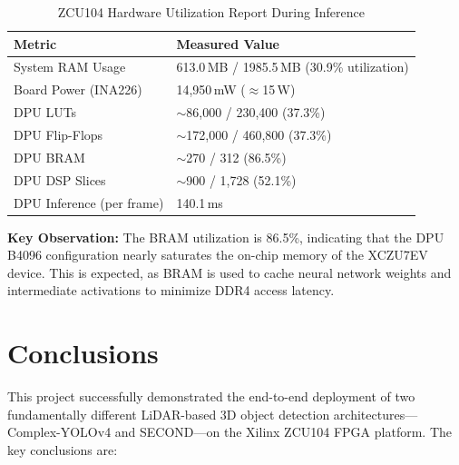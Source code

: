 \documentclass[12pt, a4paper]{report}
\begin{document}
\begin{table}[H]
\centering
\caption{ZCU104 Hardware Utilization Report During Inference}
\label{tab:hw_report}
\begin{tabular}{@{}p{4.5cm} p{9cm}@{}}
\toprule
\textbf{Metric} & \textbf{Measured Value} \\
\midrule
System RAM Usage & 613.0\,MB / 1985.5\,MB (30.9\% utilization) \\
Board Power (INA226) & 14,950\,mW ($\approx$15\,W) \\
DPU LUTs & $\sim$86,000 / 230,400 (37.3\%) \\
DPU Flip-Flops & $\sim$172,000 / 460,800 (37.3\%) \\
DPU BRAM & $\sim$270 / 312 (86.5\%) \\
DPU DSP Slices & $\sim$900 / 1,728 (52.1\%) \\
DPU Inference (per frame) & 140.1\,ms \\
\bottomrule
\end{tabular}
\end{table}

\textbf{Key Observation:} The BRAM utilization is 86.5\%, indicating that the DPU B4096 configuration nearly saturates the on-chip memory of the XCZU7EV device. This is expected, as BRAM is used to cache neural network weights and intermediate activations to minimize DDR4 access latency.


\chapter{Conclusions}

This project successfully demonstrated the end-to-end deployment of two fundamentally different LiDAR-based 3D object detection architectures---Complex-YOLOv4 and SECOND---on the Xilinx ZCU104 FPGA platform. The key conclusions are:
\end{document}
